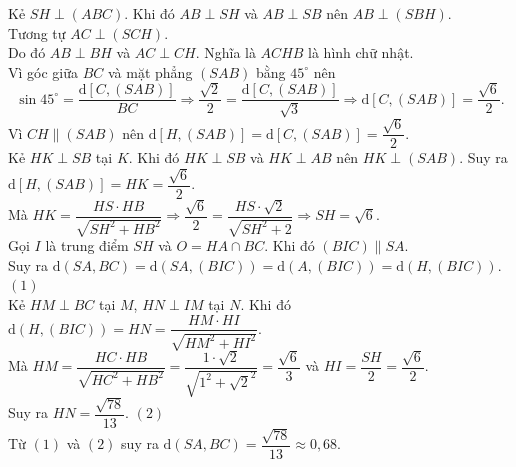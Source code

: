 \begin{ex}
{\begin{center}
\begin{tikzpicture}[line join=round, line cap=round, scale=0.9]
	\end{tikzpicture}
\end{center}
Kẻ $SH\perp (ABC)$. Khi đó $AB\perp SH$ và $AB\perp SB$ nên $AB\perp (SBH)$.\\
Tương tự $AC\perp (SCH)$.\\
Do đó $AB\perp BH$ và $AC\perp CH$. Nghĩa là $ACHB$ là hình chữ nhật.\\
Vì góc giữa $BC$ và mặt phẳng $(SAB)$ bằng $45^\circ$ nên
$$\sin 45^\circ = \dfrac{\mathrm{d}\left[ C,(SAB)\right]}{BC}\Rightarrow \dfrac{\sqrt{2}}{2} = \dfrac{\mathrm{d}\left[ C,(SAB)\right]}{\sqrt{3}} \Rightarrow \mathrm{d}\left[ C,(SAB)\right] = \dfrac{\sqrt{6}}{2}. $$
Vì $CH\parallel (SAB)$ nên $\mathrm{d}\left[ H,(SAB)\right] =\mathrm{d}\left[ C,(SAB)\right] = \dfrac{\sqrt{6}}{2}$.\\
Kẻ $HK\perp SB$ tại $K$. Khi đó $HK\perp SB$ và $HK\perp AB$ nên $HK\perp (SAB)$. Suy ra $\mathrm{d}\left[ H,(SAB)\right] = HK =\dfrac{\sqrt{6}}{2}$.\\
Mà $HK=\dfrac{HS\cdot HB}{\sqrt{SH^2 + HB^2}}\Rightarrow \dfrac{\sqrt{6}}{2} = \dfrac{HS\cdot \sqrt{2}}{\sqrt{SH^2+2}}\Rightarrow SH=\sqrt{6}$.
\\
Gọi $I$ là trung điểm $SH$ và $O=HA\cap BC$. Khi đó $(BIC)\parallel SA$.\\
Suy ra $\mathrm{d}(SA,BC) = \mathrm{d}(SA,(BIC)) = \mathrm{d}(A,(BIC)) = \mathrm{d}(H,(BIC))$. \hfill $(1)$\\
Kẻ $HM\perp BC$ tại $M$, $HN\perp IM$ tại $N$. Khi đó $\mathrm{d}(H,(BIC)) = HN = \dfrac{HM\cdot HI}{\sqrt{HM^2+HI^2}}$.\\
Mà $HM=\dfrac{HC\cdot HB}{\sqrt{HC^2+HB^2}} = \dfrac{1\cdot \sqrt{2}}{\sqrt{1^2+\sqrt{2}^2}} =\dfrac{\sqrt{6}}{3} $ và $HI=\dfrac{SH}{2} = \dfrac{\sqrt{6}}{2}$.\\
Suy ra $HN= \dfrac{\sqrt{78}}{13}$. \hfill $(2)$\\
Từ $(1)$ và $(2)$ suy ra $\mathrm{d}(SA,BC) = \dfrac{\sqrt{78}}{13}\approx 0{,}68$.
}
\end{ex}

